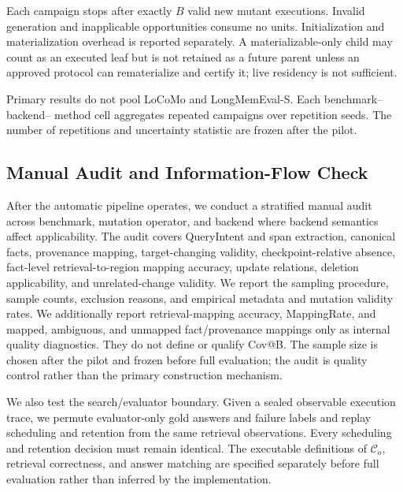 Each campaign stops after exactly \(B\) valid new mutant executions. Invalid
generation and inapplicable opportunities consume no units. Initialization and
materialization overhead is reported separately. A materializable-only child
may count as an executed leaf but is not retained as a future parent unless an
approved protocol can rematerialize and certify it; live residency is not
sufficient.

Primary results do not pool LoCoMo and LongMemEval-S. Each benchmark--backend--
method cell aggregates repeated campaigns over repetition seeds. The number of
repetitions and uncertainty statistic are frozen after the pilot.

\subsection{Manual Audit and Information-Flow Check}
\label{app:audit-information-flow}

After the automatic pipeline operates, we conduct a stratified manual audit
across benchmark, mutation operator, and backend where backend semantics affect
applicability. The audit covers QueryIntent and span extraction, canonical
facts, provenance mapping, target-changing validity, checkpoint-relative
absence, fact-level retrieval-to-region mapping accuracy, update relations,
deletion applicability, and unrelated-change validity. We report the sampling
procedure, sample counts, exclusion reasons, and empirical metadata and
mutation validity rates. We additionally report retrieval-mapping accuracy,
MappingRate, and mapped, ambiguous, and unmapped fact/provenance mappings only
as internal quality diagnostics. They do not define or qualify Cov@B. The
sample size is chosen after the pilot and frozen before full evaluation; the
audit is quality control rather than the primary construction mechanism.

We also test the search/evaluator boundary. Given a sealed observable
execution trace, we permute evaluator-only gold answers and failure labels and
replay scheduling and retention from the same retrieval observations. Every
scheduling and retention decision must remain identical. The executable
definitions of \(\mathcal{C}_o\), retrieval correctness, and answer matching
are specified separately before full evaluation rather than inferred by the
implementation.
